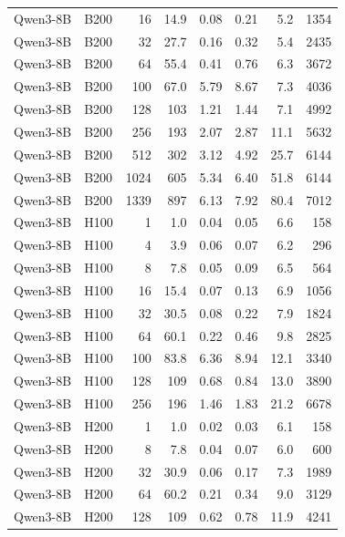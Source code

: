\begin{longtable}{llrrrrrr}
Qwen3-8B & B200 & 16 & 14.9 & 0.08 & 0.21 & 5.2 & 1354 \\
Qwen3-8B & B200 & 32 & 27.7 & 0.16 & 0.32 & 5.4 & 2435 \\
Qwen3-8B & B200 & 64 & 55.4 & 0.41 & 0.76 & 6.3 & 3672 \\
Qwen3-8B & B200 & 100 & 67.0 & 5.79 & 8.67 & 7.3 & 4036 \\
Qwen3-8B & B200 & 128 & 103 & 1.21 & 1.44 & 7.1 & 4992 \\
Qwen3-8B & B200 & 256 & 193 & 2.07 & 2.87 & 11.1 & 5632 \\
Qwen3-8B & B200 & 512 & 302 & 3.12 & 4.92 & 25.7 & 6144 \\
Qwen3-8B & B200 & 1024 & 605 & 5.34 & 6.40 & 51.8 & 6144 \\
Qwen3-8B & B200 & 1339 & 897 & 6.13 & 7.92 & 80.4 & 7012 \\
Qwen3-8B & H100 & 1 & 1.0 & 0.04 & 0.05 & 6.6 & 158 \\
Qwen3-8B & H100 & 4 & 3.9 & 0.06 & 0.07 & 6.2 & 296 \\
Qwen3-8B & H100 & 8 & 7.8 & 0.05 & 0.09 & 6.5 & 564 \\
Qwen3-8B & H100 & 16 & 15.4 & 0.07 & 0.13 & 6.9 & 1056 \\
Qwen3-8B & H100 & 32 & 30.5 & 0.08 & 0.22 & 7.9 & 1824 \\
Qwen3-8B & H100 & 64 & 60.1 & 0.22 & 0.46 & 9.8 & 2825 \\
Qwen3-8B & H100 & 100 & 83.8 & 6.36 & 8.94 & 12.1 & 3340 \\
Qwen3-8B & H100 & 128 & 109 & 0.68 & 0.84 & 13.0 & 3890 \\
Qwen3-8B & H100 & 256 & 196 & 1.46 & 1.83 & 21.2 & 6678 \\
Qwen3-8B & H200 & 1 & 1.0 & 0.02 & 0.03 & 6.1 & 158 \\
Qwen3-8B & H200 & 8 & 7.8 & 0.04 & 0.07 & 6.0 & 600 \\
Qwen3-8B & H200 & 32 & 30.9 & 0.06 & 0.17 & 7.3 & 1989 \\
Qwen3-8B & H200 & 64 & 60.2 & 0.21 & 0.34 & 9.0 & 3129 \\
Qwen3-8B & H200 & 128 & 109 & 0.62 & 0.78 & 11.9 & 4241 \\
\end{longtable}
\endgroup
